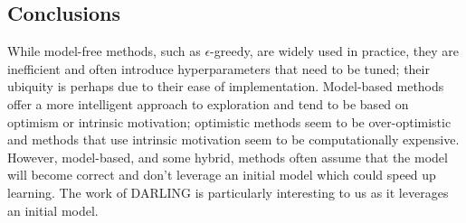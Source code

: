 \subsection{Conclusions}
While model-free methods, such as $\epsilon$-greedy, are widely used in practice, they are inefficient and often introduce hyperparameters that need to be tuned; their ubiquity is perhaps due to their ease of implementation. Model-based methods offer a more intelligent approach to exploration and tend to be based on optimism or intrinsic motivation; optimistic methods seem to be over-optimistic and methods that use intrinsic motivation seem to be computationally expensive. However, model-based, and some hybrid, methods often assume that the model will become correct and don't leverage an initial model which could speed up learning. The work of DARLING is particularly interesting to us as it leverages an initial model.

